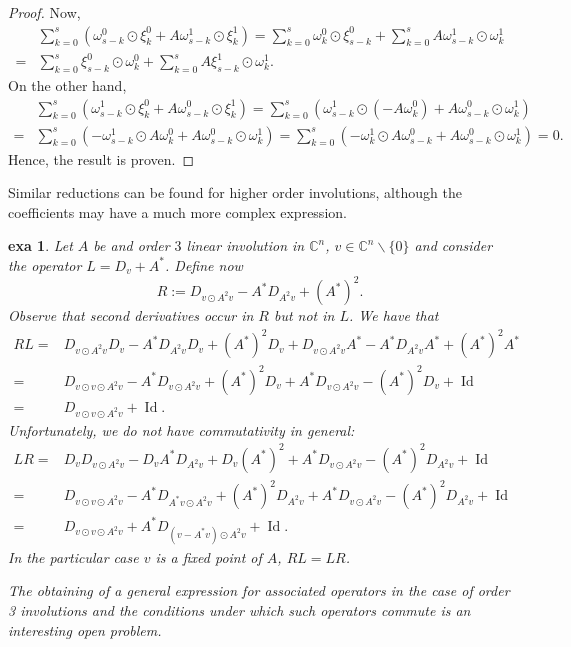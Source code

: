 \documentclass[a4paper,12pt,onecolumn]{article}
\theoremstyle{ptheorem}
\theoremstyle{hdef}
\theoremstyle{premark}
\newtheorem{exa}[thm]{exa}
\numberwithin{equation}{section}
\numberwithin{figure}{section}
\DeclareMathOperator{\Id}{Id}
\newcommand{\bC}{{\mathbb C}}
\newcommand{\<}{\langle}
\renewcommand{\>}{\rangle}
\renewcommand{\<}{\left<}
\renewcommand{\>}{\right>}
\renewcommand{\(}{\left(}
\renewcommand{\)}{\right)}
\begin{document}
\begin{proof}
Now,
\begin{align*}  & \sum_{k=0}^s\(\omega^0_{s-k}\odot\xi^0_k+A\omega^1_{s-k}\odot\xi^1_k\)=\sum_{k=0}^s\omega^0_{k}\odot\xi^0_{s-k}+\sum_{k=0}^sA\omega^1_{s-k}\odot\omega^1_k \\ = &  \sum_{k=0}^s\xi^0_{s-k}\odot\omega^0_{k}+\sum_{k=0}^sA\xi^1_{s-k}\odot\omega^1_k.\end{align*}
On the other hand,
\begin{align*} &  \sum_{k=0}^s\(\omega^1_{s-k}\odot\xi^0_k+A\omega^0_{s-k}\odot\xi^1_k\)=\sum_{k=0}^s\(\omega^1_{s-k}\odot(-A\omega^0_k)+A\omega^0_{s-k}\odot\omega^1_k\)  \\= &\sum_{k=0}^s\(-\omega^1_{s-k}\odot A\omega^0_k+A\omega^0_{s-k}\odot\omega^1_k\)=\sum_{k=0}^s\(-\omega^1_{k}\odot A\omega^0_{s-k}+A\omega^0_{s-k}\odot\omega^1_k\)=0.\end{align*}
Hence, the result is proven.
\end{proof}
Similar reductions can be found for higher order involutions, although the coefficients may have a much more complex expression.
\begin{exa}\label{o3ex} Let $A$ be and order $3$ linear involution in $\bC^n$, $v\in\bC^n\backslash\{0\}$ and consider the operator $L=D_v+A^*$. Define now 
	\[R:=D_{v\odot A^2v}-A^*D_{A^2v}+(A^*)^2.\]
Observe that second derivatives occur in $R$ but not in $L$. We have that
\begin{align*}RL= & D_{v\odot A^2v}D_v-A^*D_{A^2v}D_v+(A^*)^2D_v+D_{v\odot A^2v}A^*-A^*D_{A^2v}A^*+(A^*)^2A^*\\ = & D_{v\odot v\odot A^2v}-A^*D_{v\odot A^2v}+(A^*)^2D_v+A^*D_{v\odot A^2v}-(A^*)^2D_{v}+\Id \\ = & D_{v\odot v\odot A^2v}+\Id.\end{align*}
Unfortunately, we do not have commutativity in general:
\begin{align*}LR= & D_vD_{v\odot A^2v}-D_vA^*D_{A^2v}+D_v(A^*)^2+A^*D_{v\odot A^2v}-(A^*)^2D_{A^2v}+\Id\\ = &
D_{v\odot v\odot A^2v}-A^*D_{A^*v\odot A^2v}+(A^*)^2D_{A^2v}+A^*D_{v\odot A^2v}-(A^*)^2D_{A^2v}+\Id \\ = & D_{v\odot v\odot A^2v}+A^*D_{(v-A^*v)\odot A^2v}+\Id .\end{align*}
 In the particular case $v$ is a fixed point of $A$, $RL=LR$.\par The obtaining of a general expression for associated operators in the case of order 3 involutions and the conditions under which such operators commute is an interesting open problem.
\end{exa}
\end{document}
